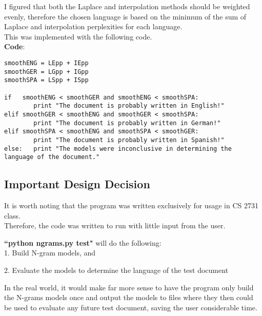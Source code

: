\documentclass[a4,10pt]{article}
\begin{document}
I figured that both the Laplace and interpolation methods should be weighted evenly, therefore the chosen language is based on the minimum of the sum of Laplace and interpolation perplexities for each language.  \\

This was implemented with the following code. \\

\textbf{Code}: 

\begin{verbatim}
smoothENG = LEpp + IEpp
smoothGER = LGpp + IGpp
smoothSPA = LSpp + ISpp

if   smoothENG < smoothGER and smoothENG < smoothSPA: 
        print "The document is probably written in English!"
elif smoothGER < smoothENG and smoothGER < smoothSPA: 
        print "The document is probably written in German!"
elif smoothSPA < smoothENG and smoothSPA < smoothGER: 
        print "The document is probably written in Spanish!"
else:   print "The models were inconclusive in determining the language of the document."
\end{verbatim} 

\newpage

\subsection{Important Design Decision}

It is worth noting that the program was written exclusively for usage in CS 2731 class. \\

Therefore, the code was written to run with little input from the user. \\

\begin{addmargin}[2em]{0em}

\textbf{``python ngrams.py test"} will do the following: \\ 

1. Build N-gram models, and  

2. Evaluate the models to determine the language of the test document \\

\end{addmargin} 

In the real world, it would make far more sense to have the program only build the N-grams models once and output the models to files where they then could be used to evaluate any future test document, saving the user considerable time. \\
\end{document}

